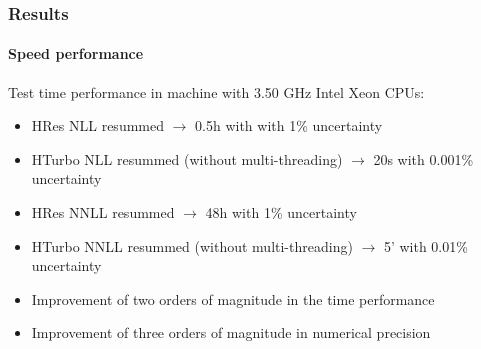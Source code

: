 \documentclass[aspectratio=43]{beamer}
\begin{document}
\begin{frame}
	
	\frametitle{Results}
	\framesubtitle{Speed performance}
	
	\footnotesize
	Test time performance in machine with 3.50 GHz Intel Xeon CPUs:
	
	\vspace{0.5 cm}
	
	\begin{itemize}
		\item HRes NLL resummed $\rightarrow$ 0.5h with with 1\% uncertainty
		\item HTurbo NLL resummed (without multi-threading) $\rightarrow$ 20s with 0.001\% uncertainty
		\item HRes NNLL resummed $\rightarrow$ 48h with 1\% uncertainty
		\item HTurbo NNLL resummed (without multi-threading) $\rightarrow$ 5' with 0.01\% uncertainty
		\item Improvement of {\color{blue}two orders of magnitude in the time performance}
		\item Improvement of {\color{blue}three orders of magnitude in numerical precision}
	\end{itemize}

\end{frame}
\end{document}
